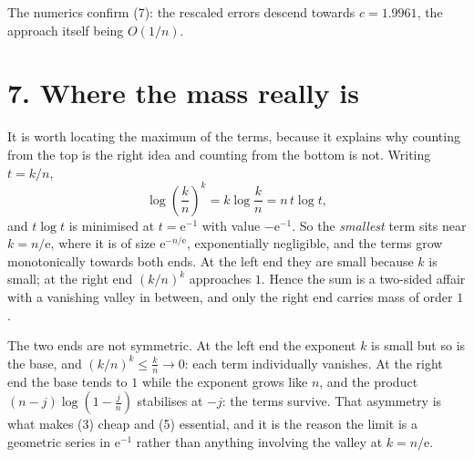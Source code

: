\documentclass[12pt]{article}
\newcommand{\e}{\mathrm{e}}
\begin{document}
The numerics confirm (7): the rescaled errors descend towards
\(c=1.9961\), the approach itself being \(O(1/n)\).

\section*{7. Where the mass really is}

It is worth locating the maximum of the terms, because it explains why
counting from the top is the right idea and counting from the bottom is
not. Writing \(t=k/n\),
\[
\log\left(\frac kn\right)^k=k\log\frac kn=n\,t\log t,
\]
and \(t\log t\) is minimised at \(t=\e^{-1}\) with value \(-\e^{-1}\).
So the \emph{smallest} term sits near \(k=n/\e\), where it is of size
\(\e^{-n/\e}\), exponentially negligible, and the terms grow
monotonically towards both ends. At the left end they are small because
\(k\) is small; at the right end \((k/n)^k\) approaches \(1\). Hence the
sum is a two-sided affair with a vanishing valley in between, and only
the right end carries mass of order \(1\).

\begin{center}
\end{center}

The two ends are not symmetric. At the left end the exponent \(k\) is
small but so is the base, and \((k/n)^k\le\frac kn\to0\): each term
individually vanishes. At the right end the base tends to \(1\) while the
exponent grows like \(n\), and the product \((n-j)\log(1-\frac jn)\)
stabilises at \(-j\): the terms survive. That asymmetry is what makes (3)
cheap and (5) essential, and it is the reason the limit is a geometric
series in \(\e^{-1}\) rather than anything involving the valley at
\(k=n/\e\).
\end{document}
